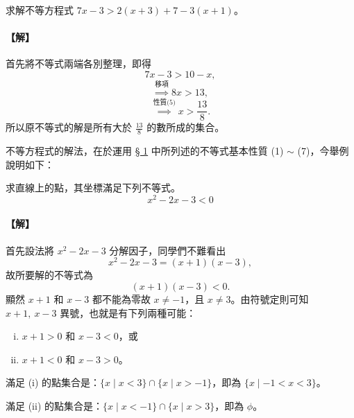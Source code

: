 \begin{example}\label{ex:b2_2-3-1}
求解不等方程式 $7x-3 > 2(x+3)+7-3(x+1)$。
\end{example}
\paragraph{【解】} 首先將不等式兩端各別整理，即得
\[
7x-3 > 10-x,
\]
\[
\overset{\text{移項}}{\implies} 8x > 13,
\]
\[
\overset{\text{性質(5)}}{\implies} x > \frac{13}{8}.
\]
所以原不等式的解是所有大於 $\frac{13}{8}$ 的數所成的集合。

不等方程式的解法，在於運用 \hyperref[sec:b2_2-1]{§ 1} 中所列述的不等式基本性質 (1) $\sim$ (7)，今舉例說明如下：

\begin{example}\label{ex:b2_2-3-2}
求直線上的點，其坐標滿足下列不等式。
\[
x^2-2x-3<0
\]
\end{example}
\paragraph{【解】} 首先設法將 $x^2-2x-3$ 分解因子，同學們不難看出
\[
x^2-2x-3 = (x+1)(x-3),
\]
故所要解的不等式為
\[
(x+1)(x-3)<0.
\]
顯然 $x+1$ 和 $x-3$ 都不能為零故 $x\ne -1$，且 $x\ne 3$。由符號定則可知 $x+1,\ x-3$ 異號，也就是有下列兩種可能：
\begin{enumerate}[(i)]
    \item $x+1>0$ 和 $x-3<0$，或
    \item $x+1<0$ 和 $x-3>0$。
\end{enumerate}
滿足 (i) 的點集合是：$\{x \mid x<3\}\cap\{x \mid x>-1\}$，即為 $\{x \mid -1<x<3\}$。

滿足 (ii) 的點集合是：$\{x \mid x<-1\}\cap\{x \mid x>3\}$，即為 $\phi$。

\begin{figure}[H]
\centering
{}
\end{figure}

